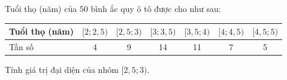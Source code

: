 \begin{ex}%
	Tuổi thọ (năm) của $50$ bình ắc quy  ô tô được cho như sau:
	\begin{center}
		\begin{tabular}{|l|c|c|c|c|c|c|}
			\hline Tuổi thọ (năm) & $[2; 2,5) $ &  $[2,5; 3) $ & $[3; 3,5) $ & $[3,5; 4) $ & $[4; 4,5) $ & $[4,5; 5) $ \\
			\hline Tần số &  4 & 9 & 14 & 11 & 7 & 5 \\
			\hline 
		\end{tabular}
	\end{center}
	Tính giá trị  đại diện của nhóm $[2{,}5;3)$.
	\loigiai{ 
	Giá trị đại  diện của nhóm $[2{,}5;3)$ là: $\dfrac{2{,}5+3}{2}=2{,}75$.}
\end{ex}

